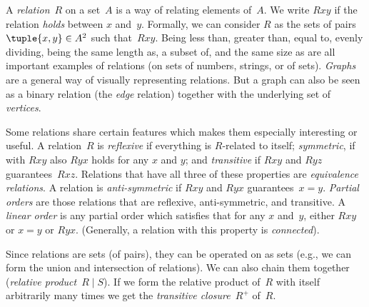 A \emph{relation}~$R$ on a set~$A$ is a way of relating elements
of~$A$. We write $Rxy$ if the relation \emph{holds} between $x$
and~$y$. Formally, we can consider $R$ as the sets of pairs
$\tuple{x,y} \in A^2$ such that~$Rxy$. Being less than, greater than,
equal to, evenly dividing, being the same length as, a subset of, and the
same size as are all important examples of relations (on
sets of numbers, strings, or of sets). \emph{Graphs} are a general way
of visually representing relations. But a graph can also be seen as a
binary relation (the \emph{edge} relation) together with the
underlying set of \emph{vertices}.

Some relations share certain features which makes them especially
interesting or useful. A relation~$R$ is \emph{reflexive} if
everything is $R$-related to itself; \emph{symmetric}, if with $Rxy$
also $Ryx$ holds for any $x$ and $y$; and \emph{transitive} if $Rxy$
and $Ryz$ guarantees~$Rxz$. Relations that have all three of these
properties are \emph{equivalence relations}. A relation is
\emph{anti-symmetric} if $Rxy$ and $Ryx$
guarantees~$x=y$. \emph{Partial orders} are those relations that are
reflexive, anti-symmetric, and transitive. A \emph{linear order} is
any partial order which satisfies that for any $x$ and~$y$, either
$Rxy$ or $x=y$ or $Ryx$. (Generally, a relation with this property is
\emph{connected}).

Since relations are sets (of pairs), they can be operated on as sets
(e.g., we can form the union and intersection of relations). We can
also chain them together (\emph{relative product}~$R \mid S$). If we
form the relative product of~$R$ with itself arbitrarily many times we
get the \emph{transitive closure}~$R^+$ of~$R$.
